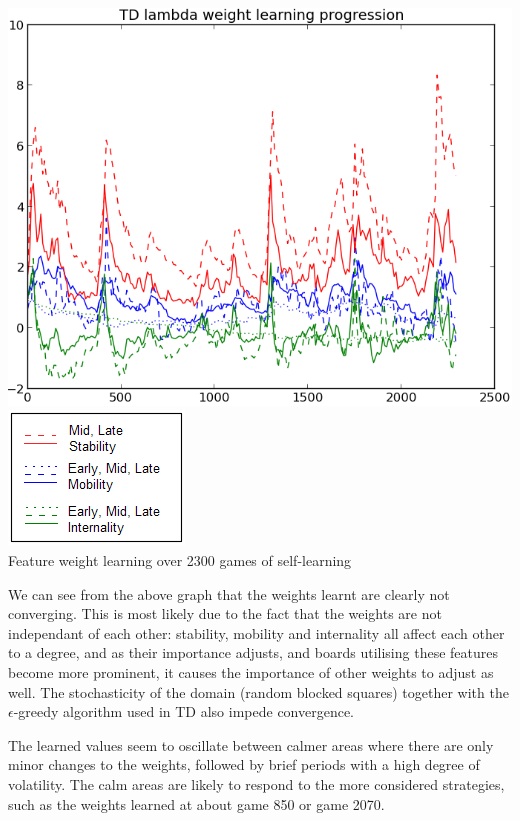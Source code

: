 \documentclass[10pt]{report}
\begin{document}
\begin{multicols}{2}
\begin{center}
\includegraphics[scale=0.35]{longgraph.png}\\
\includegraphics[scale=0.50]{legend.PNG}\\
Feature weight learning over 2300 games of self-learning
\end{center}

We can see from the above graph that the weights learnt are clearly not converging. This is most likely due to the fact that the weights are not independant of each other: stability, mobility and internality all affect each other to a degree, and as their importance adjusts, and boards utilising these features become more prominent, it causes the importance of other weights to adjust as well. The stochasticity of the domain (random blocked squares) together with the $\epsilon$-greedy algorithm used in TD also impede convergence.

The learned values seem to oscillate between calmer areas where there are only minor changes to the weights, followed by brief periods with a high degree of volatility. The calm areas are likely to respond to the more considered strategies, such as the weights learned at about game 850 or game 2070.


\end{multicols}
\end{document}
